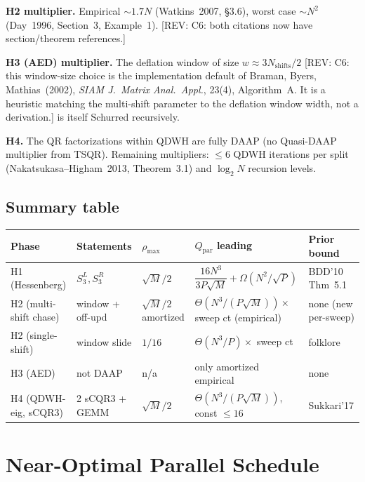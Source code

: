 \documentclass[11pt]{article}
\newcommand{\REV}[1]{\textcolor{blue!60!black}{\small\textsf{[REV: #1]}}}
\begin{document}
\textbf{H2 multiplier.} Empirical $\sim 1.7N$ (Watkins~2007, \S 3.6),
worst case $\sim N^2$ (Day~1996, Section~3, Example~1). \REV{C6:
both citations now have section/theorem references.}

\textbf{H3 (AED) multiplier.} The deflation window of size
$w \approx 3 N_{\mathrm{shifts}}/2$ \REV{C6: this window-size choice is
the implementation default of Braman, Byers, Mathias~(2002),
\emph{SIAM J.\ Matrix Anal.\ Appl.}, 23(4), Algorithm~A. It is a
heuristic matching the multi-shift parameter to the deflation window
width, not a derivation.} is itself Schurred recursively.

\textbf{H4.} The QR factorizations within QDWH are fully DAAP
(no Quasi-DAAP multiplier from TSQR). Remaining multipliers:
$\le 6$ QDWH iterations per split (Nakatsukasa--Higham~2013, Theorem~3.1)
and $\log_2 N$ recursion levels.

\subsection{Summary table}
\label{sec:B2f}

\begin{center}\scriptsize
\setlength{\tabcolsep}{4pt}
\begin{tabular}{@{}lllll@{}}
\toprule
Phase & Statements & $\rho_{\max}$ & $Q_{\text{par}}$ leading & Prior bound \\
\midrule
H1 (Hessenberg)         & $S_3^L, S_3^R$    & $\sqrt{M}/2$              & $\dfrac{16 N^3}{3 P \sqrt M} + \Omega(N^2/\sqrt P)$ & BDD'10 Thm~5.1 \\
H2 (multi-shift chase)  & window + off-upd  & $\sqrt{M}/2$ amortized    & $\Theta(N^3/(P\sqrt M)) \times$ sweep ct (empirical)& none (new per-sweep) \\
H2 (single-shift)       & window slide      & $1/16$                    & $\Theta(N^3/P) \times$ sweep ct                     & folklore \\
H3 (AED)                & not DAAP          & n/a                       & only amortized empirical                            & none \\
H4 (QDWH-eig, sCQR3)    & 2 sCQR3 + GEMM    & $\sqrt{M}/2$              & $\Theta(N^3/(P\sqrt M))$, const $\le 16$            & Sukkari'17 \\
\bottomrule
\end{tabular}
\end{center}

\section{Near-Optimal Parallel Schedule}
\label{sec:B3}
\end{document}
